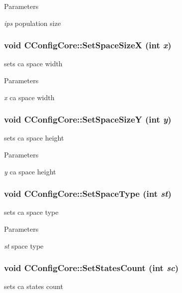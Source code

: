 \begin{DoxyParams}{Parameters}
\item[{\em ips}]population size \end{DoxyParams}
\hypertarget{classCConfigCore_aed690b7f40faa31694167d5e136e0b54}{
\subsubsection[{SetSpaceSizeX}]{\setlength{\rightskip}{0pt plus 5cm}void CConfigCore::SetSpaceSizeX (int {\em x})}}
\label{classCConfigCore_aed690b7f40faa31694167d5e136e0b54}
sets ca space width


\begin{DoxyParams}{Parameters}
\item[{\em x}]ca space width \end{DoxyParams}
\hypertarget{classCConfigCore_aada43aac83e4c9ea617f19dd5facc143}{
\subsubsection[{SetSpaceSizeY}]{\setlength{\rightskip}{0pt plus 5cm}void CConfigCore::SetSpaceSizeY (int {\em y})}}
\label{classCConfigCore_aada43aac83e4c9ea617f19dd5facc143}
sets ca space height


\begin{DoxyParams}{Parameters}
\item[{\em y}]ca space height \end{DoxyParams}
\hypertarget{classCConfigCore_a698e21d3cc2db7224c8941e3a1505e2a}{
\subsubsection[{SetSpaceType}]{\setlength{\rightskip}{0pt plus 5cm}void CConfigCore::SetSpaceType (int {\em st})}}
\label{classCConfigCore_a698e21d3cc2db7224c8941e3a1505e2a}
sets ca space type


\begin{DoxyParams}{Parameters}
\item[{\em st}]space type \end{DoxyParams}
\hypertarget{classCConfigCore_ac9c465fc1a620c5be2556b02d562b245}{
\subsubsection[{SetStatesCount}]{\setlength{\rightskip}{0pt plus 5cm}void CConfigCore::SetStatesCount (int {\em sc})}}
\label{classCConfigCore_ac9c465fc1a620c5be2556b02d562b245}
sets ca states count


